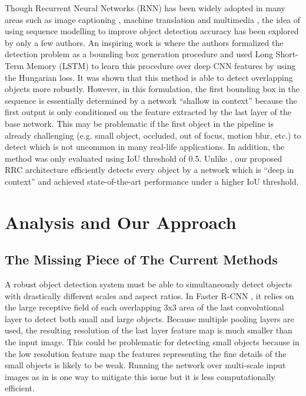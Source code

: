 \documentclass[10pt,twocolumn,letterpaper]{article}
\begin{document}
Though Recurrent Neural Networks (RNN) has been widely adopted in many areas such as image captioning \cite{Karpathy15,Xu15}, machine translation \cite{Sutskever14,Bahdanau15} and multimedia \cite{Ren16aaai}, the idea of using sequence modelling to improve object detection accuracy has been explored by only a few authors. An inspiring work is \cite{Stewart16} where the authors formalized the detection problem as a bounding box generation procedure and used Long Short-Term Memory (LSTM) \cite{Hochreiter97} to learn this procedure over deep CNN features by using the Hungarian loss. It was shown that this method is able to detect overlapping objects more robustly. However, in this formulation, the first bounding box in the sequence is essentially determined by a network ``shallow in context'' because the first output is only conditioned on the feature extracted by the last layer of the base network. This may be problematic if the first object in the pipeline is already challenging (e.g. small object, occluded, out of focus, motion blur, etc.) to detect which is not uncommon in many real-life applications. In addition, the method was only evaluated using IoU threshold of 0.5. Unlike \cite{Stewart16}, our proposed RRC architecture efficiently detects every object by a network which is ``deep in context'' and achieved state-of-the-art performance under a higher IoU threshold.

\section{Analysis and Our Approach}
\subsection{The Missing Piece of The Current Methods}
A robust object detection system must be able to simultaneously detect objects with drastically different scales and aspect ratios. In Faster R-CNN \cite{RenSQ16}, it relies on the large receptive field of each overlapping 3x3 area of the last convolutional layer to detect both small and large objects. Because multiple pooling layers are used, the resulting resolution of the last layer feature map is much smaller than the input image. This could be problematic for detecting small objects because in the low resolution feature map the features representing the fine details of the small objects is likely to be weak. Running the network over multi-scale input images as in \cite{Sermanet14} is one way to mitigate this issue but it is less computationally efficient.
\end{document}
